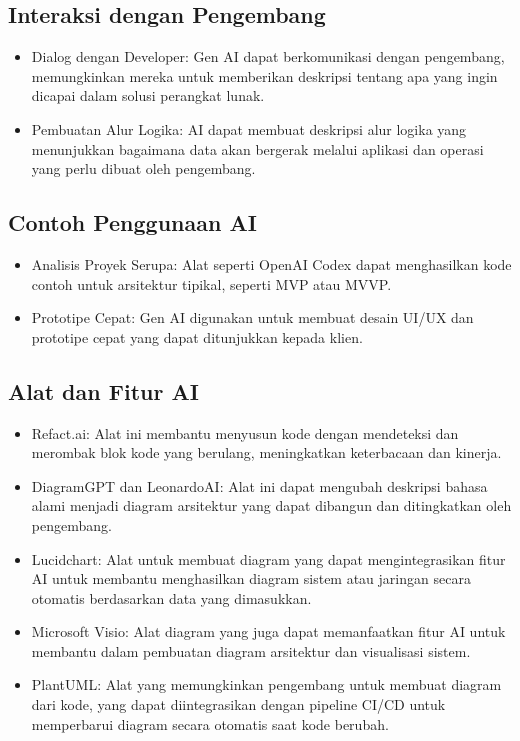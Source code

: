 \documentclass{article}
\begin{document}
\subsection{Interaksi dengan Pengembang}
\begin{itemize}
    \item Dialog dengan Developer: Gen AI dapat berkomunikasi dengan pengembang, memungkinkan mereka untuk memberikan deskripsi tentang apa yang ingin dicapai dalam solusi perangkat lunak.
    \item Pembuatan Alur Logika: AI dapat membuat deskripsi alur logika yang menunjukkan bagaimana data akan bergerak melalui aplikasi dan operasi yang perlu dibuat oleh pengembang.
\end{itemize}

\subsection{Contoh Penggunaan AI}
\begin{itemize}
    \item Analisis Proyek Serupa: Alat seperti OpenAI Codex dapat menghasilkan kode contoh untuk arsitektur tipikal, seperti MVP atau MVVP.
    \item Prototipe Cepat: Gen AI digunakan untuk membuat desain UI/UX dan prototipe cepat yang dapat ditunjukkan kepada klien.
\end{itemize}

\subsection{Alat dan Fitur AI}
\begin{itemize}
    \item Refact.ai: Alat ini membantu menyusun kode dengan mendeteksi dan merombak blok kode yang berulang, meningkatkan keterbacaan dan kinerja.
    \item DiagramGPT dan LeonardoAI: Alat ini dapat mengubah deskripsi bahasa alami menjadi diagram arsitektur yang dapat dibangun dan ditingkatkan oleh pengembang.
    \item Lucidchart: Alat untuk membuat diagram yang dapat mengintegrasikan fitur AI untuk membantu menghasilkan diagram sistem atau jaringan secara otomatis berdasarkan data yang dimasukkan.
    \item Microsoft Visio: Alat diagram yang juga dapat memanfaatkan fitur AI untuk membantu dalam pembuatan diagram arsitektur dan visualisasi sistem.
    \item PlantUML: Alat yang memungkinkan pengembang untuk membuat diagram dari kode, yang dapat diintegrasikan dengan pipeline CI/CD untuk memperbarui diagram secara otomatis saat kode berubah.
\end{itemize}
\end{document}
